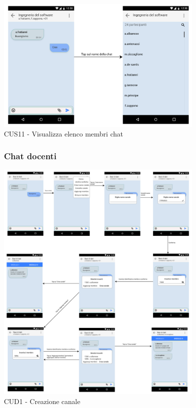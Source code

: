 \begin{figure}
	\centering
	\includegraphics[width=0.9\textwidth]{imgs/gruppo6/activities/act_cus11_elenco_membri.pdf}
	\caption{CUS11 - Visualizza elenco membri chat}
	\label{fig:act-cus11}
\end{figure}

\pagebreak
\begin{figure}
	\subsubsection{Chat docenti}
	\centering
	\includegraphics[width=0.9\textwidth]{imgs/gruppo6/activities/act_cud1_creazione_canale.pdf}
	\caption{CUD1 - Creazione canale}
	\label{fig:act-cud1}
\end{figure}

